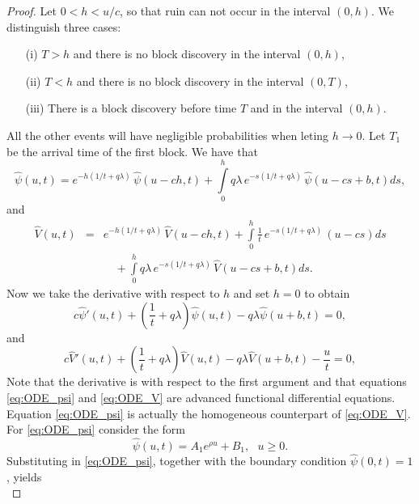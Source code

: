 \begin{proof}
Let $0<h<u/c$, so that ruin can not occur in the interval $(0,h)$. We distinguish three cases:
\begin{itemize}
  \item[(i)] $T>h$ and there is no block discovery in the interval $(0,h)$,
  \item[(ii)] $T<h$ and there is no block discovery in the interval $(0,T)$,
  \item[(iii)] There is a block discovery before time $T$ and in the interval $(0,h)$. 
\end{itemize}
All the other events will have negligible probabilities when leting $h\rightarrow0$.
Let $T_1$ be the arrival time of the first block. We have that  
\begin{equation*}
  \widehat{\psi}(u,t)=e^{-h(1/t + q\lambda)}\,\widehat{\psi}(u-ch,t) +\int\limits_0^h q\lambda\, e^{-s(1/t + q\lambda)}\,\widehat{\psi}(u-cs+b,t)ds,
  \end{equation*}
and 
\begin{eqnarray*}
  \widehat{V}(u,t)& =&e^{-h(1/t + q\lambda)}\,\widehat{V}(u-ch,t)+\int\limits_0^h\frac1t\, e^{-s(1/t + q\lambda)}\,(u-cs)ds\\
  &&\quad+\int\limits_0^h q\lambda\, e^{-s(1/t + q\lambda)}\,\widehat{V}(u-cs+b,t)ds.
  \end{eqnarray*}
Now we take the derivative with respect to $h$ and set $h=0$ to obtain
\begin{equation}\label{eq:ODE_psi}
c\widehat{\psi}'(u,t) + \left(\frac{1}{t} +  q\lambda\right)\widehat{\psi}(u,t) - q\lambda \widehat{\psi}(u+b,t)=0,
\end{equation}
 and
\begin{equation}\label{eq:ODE_V}
c\widehat{V}'(u,t) + \left(\frac{1}{t} +  q\lambda\right)\widehat{V}(u,t) - q\lambda \widehat{V}(u+b,t) - \frac{u}{t} =0,
\end{equation}
Note that the derivative is with respect to the first argument and that equations \eqref{eq:ODE_psi} and \eqref{eq:ODE_V} are advanced functional differential equations. Equation \eqref{eq:ODE_psi} is actually the homogeneous counterpart of \eqref{eq:ODE_V}. For \eqref{eq:ODE_psi} consider the form 
\begin{equation}\label{eq:potential_solution_psi}
\widehat{\psi}(u,t) = A_1e^{\rho u } + B_1,\text{ }u \ge 0. 
\end{equation}
Substituting in \eqref{eq:ODE_psi}, together with the boundary condition $\widehat{\psi}(0,t) = 1$, yields
\begin{equation*}

\end{equation*}
\end{proof}
